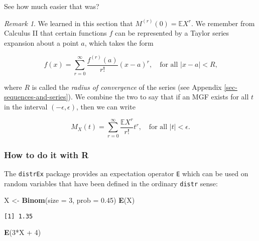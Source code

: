 \documentclass[]{book}
\newenvironment{Shaded}{\begin{snugshade}}{\end{snugshade}}
\newcommand{\KeywordTok}[1]{\textcolor[rgb]{0.13,0.29,0.53}{\textbf{{#1}}}}
\newcommand{\DataTypeTok}[1]{\textcolor[rgb]{0.13,0.29,0.53}{{#1}}}
\newcommand{\DecValTok}[1]{\textcolor[rgb]{0.00,0.00,0.81}{{#1}}}
\newcommand{\FloatTok}[1]{\textcolor[rgb]{0.00,0.00,0.81}{{#1}}}
\newcommand{\StringTok}[1]{\textcolor[rgb]{0.31,0.60,0.02}{{#1}}}
\newcommand{\NormalTok}[1]{{#1}}
\numberwithin{equation}{chapter}
\numberwithin{figure}{chapter}
\theoremstyle{plain}
\theoremstyle{definition}
\theoremstyle{remark}
\theoremstyle{definition}
\theoremstyle{definition}
\theoremstyle{remark}
\newtheorem*{remark}{Remark}
\begin{document}
See how much easier that was?

\bigskip

\begin{remark}
We learned in this section that \(M^{(r)}(0) = \mathbb{E} X^{r}\). We
remember from Calculus II that certain functions \(f\) can be
represented by a Taylor series expansion about a point \(a\), which
takes the form

\begin{equation}
f(x)=\sum_{r=0}^{\infty}\frac{f^{(r)}(a)}{r!}(x-a)^{r},\quad \mbox{for all \(|x-a| < R\),}
\end{equation}

where \(R\) is called the \emph{radius of convergence} of the series
(see Appendix \ref{sec-sequences-and-series}). We combine the two to say
that if an MGF exists for all \(t\) in the interval
\((-\epsilon,\epsilon)\), then we can write

\begin{equation}
M_{X}(t)=\sum_{r=0}^{\infty}\frac{\mathbb{E} X^{r}}{r!}t^{r},\quad \mbox{for all $|t|<\epsilon$.}
\end{equation}
\end{remark}

\subsubsection{How to do it with R}\label{how-to-do-it-with-r-22}

The \texttt{distrEx} package \autocite{distrEx} provides an expectation
operator \texttt{E} which can be used on random variables that have been
defined in the ordinary \texttt{distr} sense:

\begin{Shaded}
\begin{Highlighting}[]
\NormalTok{X <-}\StringTok{ }\KeywordTok{Binom}\NormalTok{(}\DataTypeTok{size =} \DecValTok{3}\NormalTok{, }\DataTypeTok{prob =} \FloatTok{0.45}\NormalTok{)}
\KeywordTok{E}\NormalTok{(X)}
\end{Highlighting}
\end{Shaded}

\begin{verbatim}
[1] 1.35
\end{verbatim}

\begin{Shaded}
\begin{Highlighting}[]
\KeywordTok{E}\NormalTok{(}\DecValTok{3}\NormalTok{*X +}\StringTok{ }\DecValTok{4}\NormalTok{)}
\end{Highlighting}
\end{Shaded}
\end{document}
